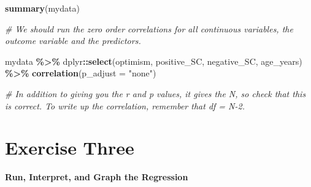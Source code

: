 \documentclass[
]{book}
\newenvironment{Shaded}{\begin{snugshade}}{\end{snugshade}}
\newcommand{\AttributeTok}[1]{\textcolor[rgb]{0.13,0.29,0.53}{#1}}
\newcommand{\CommentTok}[1]{\textcolor[rgb]{0.56,0.35,0.01}{\textit{#1}}}
\newcommand{\FunctionTok}[1]{\textcolor[rgb]{0.13,0.29,0.53}{\textbf{#1}}}
\newcommand{\NormalTok}[1]{#1}
\newcommand{\SpecialCharTok}[1]{\textcolor[rgb]{0.81,0.36,0.00}{\textbf{#1}}}
\newcommand{\StringTok}[1]{\textcolor[rgb]{0.31,0.60,0.02}{#1}}
\let\oldsection\section
\renewcommand{\section}{\needspace{5\baselineskip}\oldsection}
\begin{document}
\begin{Shaded}
\begin{Highlighting}[]
\FunctionTok{summary}\NormalTok{(mydata)}

\CommentTok{\# We should run the zero order correlations for all continuous variables, the outcome variable and the predictors.}

\NormalTok{mydata }\SpecialCharTok{\%\textgreater{}\%}
\NormalTok{  dplyr}\SpecialCharTok{::}\FunctionTok{select}\NormalTok{(optimism, positive\_SC, negative\_SC, age\_years) }\SpecialCharTok{\%\textgreater{}\%}
  \FunctionTok{correlation}\NormalTok{(}\AttributeTok{p\_adjust =} \StringTok{"none"}\NormalTok{)}

\CommentTok{\# In addition to giving you the r and p values, it gives the N, so check that this is correct. To write up the correlation, remember that df = N{-}2.}
\end{Highlighting}
\end{Shaded}

\section{Exercise Three}\label{exercise-three-2}

\textbf{Run, Interpret, and Graph the Regression}
\end{document}
